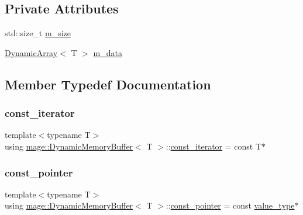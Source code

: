 \subsection*{Private Attributes}
\begin{DoxyCompactItemize}
\item 
std\+::size\+\_\+t \mbox{\hyperlink{classmage_1_1_dynamic_memory_buffer_acf5ede9a31d65f4184a7e1a4ca2a66cc}{m\+\_\+size}}
\item 
\mbox{\hyperlink{classmage_1_1_dynamic_array}{Dynamic\+Array}}$<$ T $>$ \mbox{\hyperlink{classmage_1_1_dynamic_memory_buffer_a7be8966cec7e1d42e57b4ee0c3ba32d3}{m\+\_\+data}}
\end{DoxyCompactItemize}


\subsection{Member Typedef Documentation}
\mbox{\label{classmage_1_1_dynamic_memory_buffer_ad6f32f829dcde2a912f53ed18080ab9c}} 
\subsubsection{\texorpdfstring{const\+\_\+iterator}{const\_iterator}}
{\footnotesize\ttfamily template$<$typename T$>$ \\
using \mbox{\hyperlink{classmage_1_1_dynamic_memory_buffer}{mage\+::\+Dynamic\+Memory\+Buffer}}$<$ T $>$\+::\mbox{\hyperlink{classmage_1_1_dynamic_memory_buffer_ad6f32f829dcde2a912f53ed18080ab9c}{const\+\_\+iterator}} =  const T$\ast$}

\mbox{\label{classmage_1_1_dynamic_memory_buffer_af1721cabd35311ed93a51e8dc973fda7}} 
\subsubsection{\texorpdfstring{const\+\_\+pointer}{const\_pointer}}
{\footnotesize\ttfamily template$<$typename T$>$ \\
using \mbox{\hyperlink{classmage_1_1_dynamic_memory_buffer}{mage\+::\+Dynamic\+Memory\+Buffer}}$<$ T $>$\+::\mbox{\hyperlink{classmage_1_1_dynamic_memory_buffer_af1721cabd35311ed93a51e8dc973fda7}{const\+\_\+pointer}} =  const \mbox{\hyperlink{classmage_1_1_dynamic_memory_buffer_a951f47f06268fe148ed617d17cad6150}{value\+\_\+type}}$\ast$}

